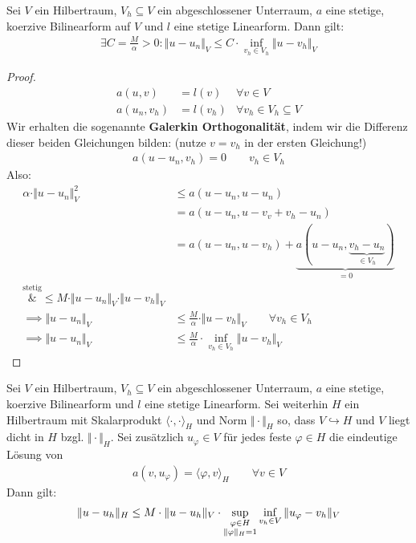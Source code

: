 \begin{theorem}\enter\label{theorem2.2CeasLemma}
Sei $V$ ein Hilbertraum, $V_h\subseteq V$ ein abgeschlossener Unterraum, $a$ eine stetige, koerzive Bilinearform auf $V$ und $l$ eine stetige Linearform. Dann gilt:
\begin{align*}
\exists C=\frac{M}{\alpha}>0:\Vert u-u_n\Vert_V\leq C\cdot\inf\limits_{v_h\in V_h}\Vert u-v_h\Vert_V
\end{align*}
\end{theorem}
\begin{proof}
\begin{align*}
a(u,v)&=l(v) &\forall v\in V\\
a(u_n,v_h)&= l(v_h) &\forall v_h\in V_h\subseteq V
\end{align*}
Wir erhalten die sogenannte \textbf{Galerkin Orthogonalität}, indem wir die Differenz dieser beiden Gleichungen bilden: (nutze $v=v_h$ in der ersten Gleichung!) 
\begin{align}\label{eqGalerkinOrthogonalitaet}\tag{GalerkinOrtho}
a(u-u_n,v_h)=0\qquad v_h\in V_h
\end{align}
Also:
\begin{align*}
\alpha\cdot\Vert u-u_n\Vert^2_V
&\leq
a(u-u_n,u-u_n)\\
&=a(u-u_n,u-v_v+v_h- u_n)\\
&=a(u-u_n,u-v_h)+\underbrace{a(u-u_n,\underbrace{v_h-u_n}_{\in V_h})}_{=0}\\
\overset{\text{stetig}}&{\leq}
M\cdot\Vert u-u_n\Vert_V\cdot\Vert u-v_h\Vert_V\\
\implies
\Vert u-u_n\Vert_V&\leq\frac{M}{\alpha}\cdot\Vert u-v_h\Vert_V\qquad\forall v_h\in V_h\\
\implies
\Vert u-u_n\Vert_V&\leq \frac{M}{\alpha}\cdot\inf\limits_{v_h\in V_h}\Vert u-v_h\Vert_V
\end{align*}
\end{proof}

\begin{theorem}\enter\label{theorem2.3AubinNietscheDualitaetsargument}
Sei $V$ ein Hilbertraum, $V_h\subseteq V$ ein abgeschlossener Unterraum, $a$ eine stetige, koerzive Bilinearform und $l$ eine stetige Linearform. Sei weiterhin $H$ ein Hilbertraum mit Skalarprodukt $\langle\cdot,\cdot\rangle_H$ und Norm $\Vert\cdot\Vert_H$ so, dass $V\hookrightarrow H$ und $V$ liegt dicht in $H$ bzgl. $\Vert\cdot\Vert_H$. Sei zusätzlich $u_\varphi\in V$ für jedes feste $\varphi\in H$ die eindeutige Lösung von
\begin{align}\label{Dtheorem2.3}\tag{D}
a(v,u_\varphi)=\langle\varphi,v\rangle_H\qquad\forall v\in V
\end{align}
Dann gilt:
\begin{align*}
\Vert u-u_h\Vert_H\leq M\cdot\Vert u-u_h\Vert_V\cdot\sup\limits_{\begin{subarray}{c}\varphi\in H\\\Vert\varphi\Vert_H=1\end{subarray}}\inf\limits_{v_h\in V}\Vert u_\varphi-v_h\Vert_V
\end{align*}
\end{theorem}

